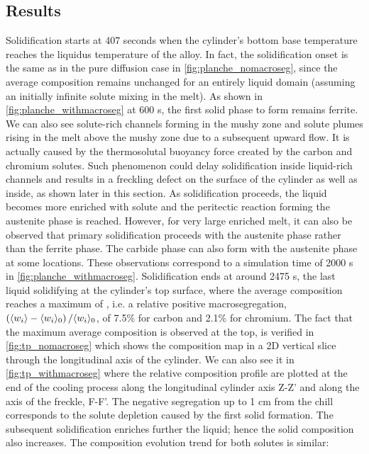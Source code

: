 \subsection{Results}
Solidification starts at 407 seconds when the cylinder’s bottom base temperature 
reaches the liquidus temperature of the alloy. 
In fact, the solidification onset is the same as in the pure diffusion case in \cref{fig:planche_nomacroseg}, 
since the average composition remains unchanged for an entirely liquid domain (assuming an initially infinite 
solute mixing in the melt). As shown in \cref{fig:planche_withmacroseg} at 600 s, the first solid phase to form 
remains ferrite. We can also see solute-rich channels forming in the mushy zone and solute 
plumes rising in the melt above the mushy zone due to a subsequent upward flow. It is actually 
caused by the thermosolutal buoyancy force created by the carbon and chromium solutes. Such 
phenomenon could delay solidification inside liquid-rich channels and results in a freckling 
defect \citep{felicelli_simulation_1991} on the surface of the cylinder as well as inside, as shown later in this section. 
As solidification proceeds, the liquid becomes more enriched with solute and the peritectic 
reaction forming the austenite phase is reached. However, for very large enriched melt, it can 
also be observed that primary solidification proceeds with the austenite phase rather than the 
ferrite phase. The carbide phase can also form with the austenite phase at some locations. These 
observations correspond to a simulation time of \num{2000} s in \cref{fig:planche_withmacroseg}. Solidification ends at 
around \num{2475} s, the last liquid solidifying at the cylinder’s top surface, where the average composition 
reaches a maximum of , i.e. a relative positive macrosegregation, 
$\left( \langle w_i \rangle-\langle w_i \rangle_0 \right)/\langle w_i \rangle_0$, of 7.5\% for carbon and 2.1\% for chromium. The fact that the maximum average 
composition is observed at the top, is verified in \cref{fig:tp_nomacroseg} which shows the composition map in a 2D 
vertical slice through the longitudinal axis of the cylinder. We can also see it in \cref{fig:tp_withmacroseg} where the 
relative composition profile are plotted at the end of the cooling process along the longitudinal cylinder 
axis Z-Z’ and along the axis of the freckle, F-F’. The negative segregation up to 1 cm from the chill corresponds 
to the solute depletion caused by the first solid formation. The subsequent solidification enriches further the 
liquid; hence the solid composition also increases. The composition evolution trend for both solutes is similar: 
